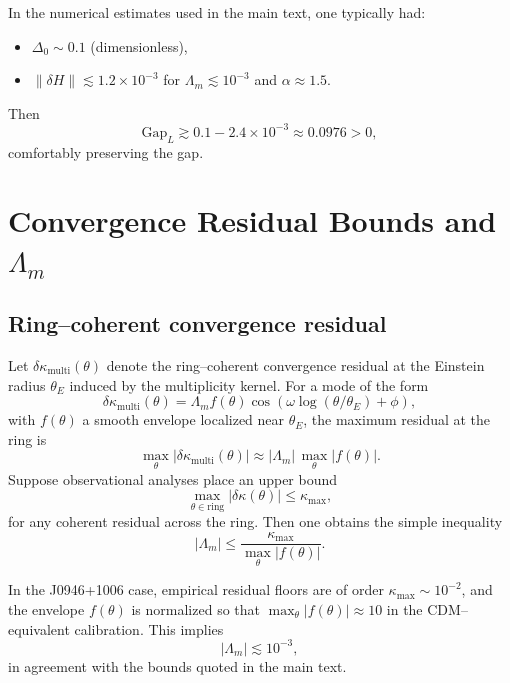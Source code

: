 \documentclass[11pt]{article}
\begin{document}
In the numerical estimates used in the main text, one typically had:
\begin{itemize}[leftmargin=*]
  \item $\Delta_0 \sim 0.1$ (dimensionless),
  \item $\|\delta H\|\lesssim 1.2\times 10^{-3}$ for $\Lambda_m \lesssim 10^{-3}$ and $\alpha\approx 1.5$.
\end{itemize}
Then
\[
\mathrm{Gap}_L \gtrsim 0.1 - 2.4\times 10^{-3} \approx 0.0976 > 0,
\]
comfortably preserving the gap.

\section{Convergence Residual Bounds and $\Lambda_m$}

\subsection{Ring--coherent convergence residual}

Let $\delta\kappa_{\text{multi}}(\theta)$ denote the ring--coherent convergence residual at the Einstein radius $\theta_E$ induced by the multiplicity kernel. For a mode of the form
\[
\delta\kappa_{\text{multi}}(\theta)
= \Lambda_m f(\theta) \cos(\omega \log(\theta/\theta_E) + \phi),
\]
with $f(\theta)$ a smooth envelope localized near $\theta_E$, the maximum residual at the ring is
\begin{equation}
\max_{\theta}\big|\delta\kappa_{\text{multi}}(\theta)\big|
\approx |\Lambda_m|\, \max_{\theta}|f(\theta)|.
\end{equation}
Suppose observational analyses place an upper bound
\begin{equation}
\max_{\theta\in \text{ring}}|\delta\kappa(\theta)| \leq \kappa_{\text{max}},
\end{equation}
for any coherent residual across the ring. Then one obtains the simple inequality
\begin{equation}
|\Lambda_m| \leq \frac{\kappa_{\text{max}}}{\max_{\theta}|f(\theta)|}.
\end{equation}

In the J0946+1006 case, empirical residual floors are of order $\kappa_{\text{max}} \sim 10^{-2}$, and the envelope $f(\theta)$ is normalized so that $\max_{\theta}|f(\theta)|\approx 10$ in the CDM--equivalent calibration. This implies
\[
|\Lambda_m| \lesssim 10^{-3},
\]
in agreement with the bounds quoted in the main text.
\end{document}
